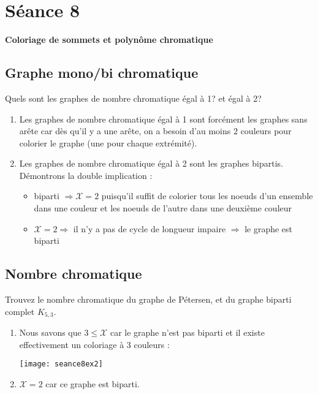 \section{Séance 8}

\textbf{Coloriage de sommets et polynôme chromatique}

\subsection{Graphe mono/bi chromatique}
Quels sont les graphes de nombre chromatique égal à 1? et égal à 2?

\begin{solution}
  \begin{enumerate}
    \item Les graphes de nombre chromatique égal à 1 sont forcément les graphes sans arête car dès qu'il y a une arête, on a besoin d'au moins $2$ couleurs pour colorier le graphe (une pour chaque extrémité).
    \item Les graphes de nombre chromatique égal à 2 sont les graphes bipartis. Démontrons la double implication :
    \begin{itemize}
    \item biparti $\Rightarrow \mathcal{X} = 2 $ puisqu'il suffit de colorier tous les noeuds d'un ensemble dans une couleur et les noeuds de l'autre dans une deuxième couleur
    \item $\mathcal{X} = 2 \Rightarrow$ il n'y a pas de cycle de longueur impaire $\Rightarrow$ le graphe est biparti
     \end{itemize}
  \end{enumerate}
\end{solution}

\subsection{Nombre chromatique}
Trouvez le nombre chromatique du graphe de Pétersen, et du graphe biparti complet $K_{5,3}$.

\begin{solution}
  \begin{enumerate}
    \item Nous savons que $3 \leq \mathcal{X}$ car le graphe n'est pas biparti et il existe effectivement un coloriage à  $3$ couleurs :
    \begin{center}
    	\texttt{[image: seance8ex2]}
     \end{center}
    \item  $\mathcal{X} = 2$ car ce graphe est biparti.
  \end{enumerate}
\end{solution}

